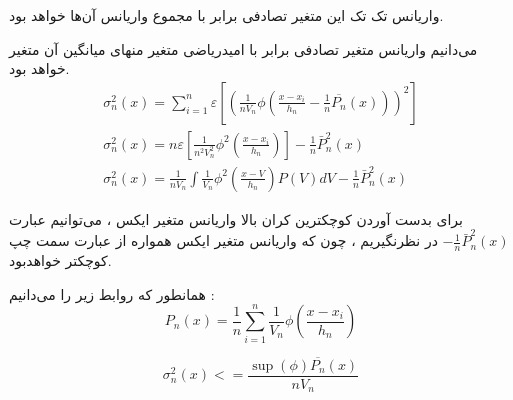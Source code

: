 \begin{boxC}
واریانس تک تک این 
متغیر تصادفی برابر با مجموع واریانس آن‌ها خواهد بود.

می‌دانیم واریانس متغیر تصادفی برابر با امیدریاضی متغیر منهای میانگین آن متغیر خواهد بود.
    $$
\begin{gathered}
\sigma_n^2(x) = \sum_{i=1}^n \varepsilon\left[\left(\frac{1}{n V_n} \phi\left(\frac{x-x_i}{h_n} -\frac{1}{n} \overline{P_n}(x)\right)\right)^2\right] \\

\sigma_n^2(x)=n \varepsilon\left[\frac{1}{n^2 V_n^2} \phi^2\left(\frac{x-x_i}{h_n}\right)\right]-\frac{1}{n} \bar{P}_n^2(x) \\
\sigma_n^2(x)=\frac{1}{n V_n} \int \frac{1}{V_n} \phi^2\left(\frac{x-V}{h_n}\right) P(V) d V-\frac{1}{n} \bar{P}_n^2(x)
\end{gathered}
$$

برای بدست آوردن کوچکترین کران بالا واریانس متغیر ایکس ، می‌توانیم عبارت 
$ -\frac{1}{n} \bar{P}_n^2(x) $
در نظرنگیریم ، چون که واریانس متغیر ایکس همواره از عبارت سمت چپ کوچکتر خواهدبود.


همانطور که روابط زیر را می‌دانیم : 
$$
P_n(x)=\frac{1}{n} \sum_{i=1}^n \frac{1}{V_n} \phi\left(\frac{x-x_i}{h_n}\right)
$$

$$ \sigma_n^2(x) <= \frac{\sup (\phi) \overline{P_n}(x)}{n V_n}$$
\end{boxC}